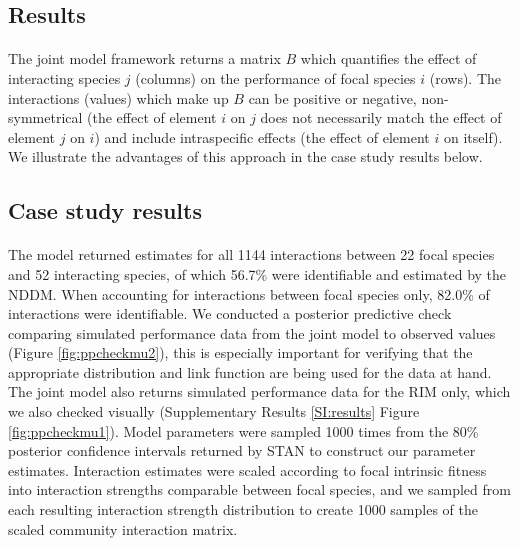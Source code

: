 \documentclass[a4,12pt]{article}
\begin{document}
\begin{refsection}
\section{Results}
    
    \paragraph{}
    The joint model framework returns a matrix $B$ which quantifies the effect of interacting species $j$ (columns) on the performance of focal species $i$ (rows). The interactions (values) which make up $B$ can be positive or negative, non-symmetrical (the effect of element $i$ on $j$ does not necessarily match the effect of element $j$ on $i$) and include intraspecific effects (the effect of element $i$ on itself). We illustrate the advantages of this approach in the case study results below. 


    \subsection{Case study results}

    \paragraph{}
    The model returned estimates for all 1144 interactions between 22 focal species and 52 interacting species, of which 56.7\% were identifiable and estimated by the NDDM.  When accounting for interactions between focal species only, 82.0\% of interactions were identifiable. We conducted a posterior predictive check comparing simulated performance data from the joint model to observed values (Figure \ref{fig:ppcheckmu2}), this is especially important for verifying that the appropriate distribution and link function are being used for the data at hand. The joint model also returns simulated performance data for the RIM only, which we also checked visually (Supplementary Results \ref{SI:results} Figure \ref{fig:ppcheckmu1}). Model parameters were sampled 1000 times from the 80\% posterior confidence intervals returned by STAN to construct our parameter estimates. Interaction estimates were scaled according to focal intrinsic fitness into interaction strengths comparable between focal species, and we sampled from each resulting interaction strength distribution to create 1000 samples of the scaled community interaction matrix.


\end{refsection}
\end{document}
